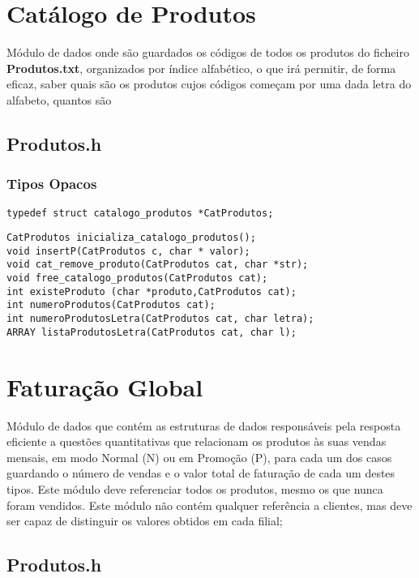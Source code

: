 \section{Catálogo de Produtos}

 Módulo de dados onde são guardados os códigos de todos os produtos do ficheiro \textbf{Produtos.txt}, organizados por índice alfabético, o que irá permitir, de forma eficaz, saber quais são os produtos cujos códigos começam por uma dada letra do alfabeto, quantos são



\subsection{Produtos.h}

\subsubsection{Tipos Opacos}
\begin{verbatim}
typedef struct catalogo_produtos *CatProdutos;
\end{verbatim}


\begin{Verbatim}
CatProdutos inicializa_catalogo_produtos();
void insertP(CatProdutos c, char * valor);
void cat_remove_produto(CatProdutos cat, char *str);
void free_catalogo_produtos(CatProdutos cat);
int existeProduto (char *produto,CatProdutos cat);
int numeroProdutos(CatProdutos cat);
int numeroProdutosLetra(CatProdutos cat, char letra);
ARRAY listaProdutosLetra(CatProdutos cat, char l);
\end{Verbatim}


\section{Faturação Global}

Módulo de dados que contém as estruturas de dados responsáveis pela resposta eficiente a questões quantitativas que relacionam os produtos às suas vendas mensais, em modo Normal (N) ou em Promoção (P), para cada um dos casos guardando o número de vendas e o valor total de faturação de cada um destes tipos. Este módulo deve referenciar todos os produtos, mesmo os que nunca foram vendidos.
Este módulo não contém qualquer referência a clientes, mas deve ser capaz de distinguir os valores obtidos em cada filial; 

\subsection{Produtos.h}

